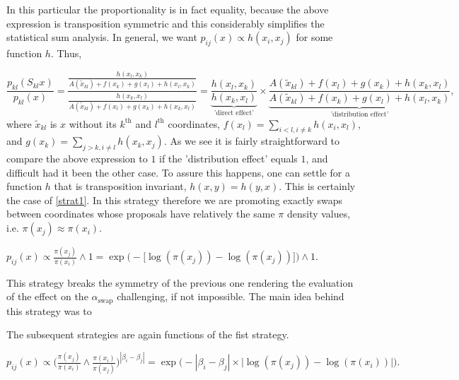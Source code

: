 In this particular the proportionality is in fact equality, because the above expression is transposition symmetric and this considerably simplifies the statistical sum analysis. In general, we want $p_{ij}(x) \propto h(x_i,x_j)$ for some function $h$. Thus,

\begin{equation*}
	\frac{p_{kl}(S_{kl}x)}{p_{kl}(x)} = \frac{\frac{h(x_l,x_k)}{A(\tilde{x}_{kl})+f(x_k)+g(x_l)+h(x_l,x_k)}}{
	\frac{h(x_k,x_l)}{A(\tilde{x}_{kl})+f(x_l)+g(x_k)+h(x_k,x_l)}
	} = 
	\underbrace{\frac{h(x_l,x_k)}{h(x_k,x_l)}}_\text{'direct effect'} 
	\times 
	\underbrace{\frac{A(\tilde{x}_{kl})+f(x_l)+g(x_k)+h(x_k,x_l)}{A(\tilde{x}_{kl})+f(x_k)+g(x_l)+h(x_l,x_k)}}_\text{'distribution effect'},	 	 	
\end{equation*}  
where $\tilde{x}_{kl}$ is $x$ without its $k^\text{th}$ and $l^\text{th}$ coordinates, $f(x_l) = \sum_{i<l, i\not=k} h(x_i, x_l)$, and $g(x_k) = \sum_{j>k, i\not=l}h(x_k, x_j)$. As we see it is fairly straightforward to compare the above expression to $1$ if the 'distribution effect' equals $1$, and difficult had it been the other case. To assure this happens, one can settle for a function $h$ that is transposition invariant, $h(x,y)=h(y,x)$. This is certainly the case of \ref{strat1}. In this strategy therefore we are promoting exactly swaps between coordinates whose proposals have relatively the same $\pi$ density values, i.e. $\pi (x_j) \approx \pi (x_i)$. 



\begin{strategy}[resume]
	\item 
		$
			p_{ij}(x) \propto 
			\frac{\pi (x_j)}{\pi (x_i)} \wedge 1 = 
			\exp \Big( - \big[ \log ( \pi(x_j) ) - \log ( \pi(x_j) ) \big]\Big) \wedge 1.$\label{strat2}
\end{strategy}

This strategy breaks the symmetry of the previous one rendering the evaluation of the effect on the $\alpha_\text{swap}$ challenging, if not impossible. The main idea behind this strategy was to  


The subsequent strategies are again functions of the fist strategy.

\begin{strategy}[resume]
	\item 
		$p_{ij}(x) \propto 
			\Big( \frac{\pi (x_j)}{\pi( x_i )} \wedge 
			\frac{\pi (	x_i)}{\pi( x_j )} \Big)^{|\beta_i - \beta_j|} = 
		\exp \Big( - |\beta_i - \beta_j| \times \big| \log ( \pi(x_j) ) - \log ( \pi(x_i) ) \big| \Big).$\label{strat3} 
\end{strategy}

